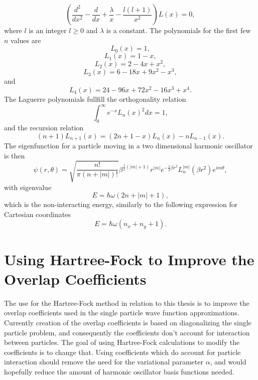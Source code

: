 \documentclass[../main.tex]{subfiles}
\begin{document}
\begin{equation}
    \left( \frac{d^2}{dx^2} - \frac{d}{dx} + \frac{\lambda}{x} - \frac{l(l+1)}{x^2} \right) L(x) = 0,
\end{equation}
where $l$ is an integer $l \geq 0$ and $\lambda$ is a constant. The polynomials for the first few $n$ values are
\begin{equation}
    L_0(x) = 1,
\end{equation}
\begin{equation}
    L_1(x) = 1-x,
\end{equation}
\begin{equation}
    L_2(x) = 2 - 4x + x^2,
\end{equation}
\begin{equation}
    L_3(x) = 6 - 18x + 9x^2 - x^3,
\end{equation}
and
\begin{equation}
    L_4(x) = 24 - 96x + 72x^2 -16x^3 + x^4.
\end{equation}
The Laguerre polynomials fullfill the orthogonality relation 
\begin{equation}
    \int_0^\infty e^{-x} L_n(x)^2 dx = 1,
\end{equation}
and the recursion relation 
\begin{equation}
    (n+1) L_{n+1}(x) = (2n + 1 - x) L_n(x) - n L_{n-1}(x).
\end{equation}
The eigenfunction for a particle moving in a two dimensional harmonic oscillator is then 
\begin{equation}
    \psi(r, \theta) = \sqrt{\frac{n!}{\pi (n + |m|)!}} \beta^{\frac{1}{2}(|m|+1)} r^{|m|} e^{-\frac{1}{2}\beta r^2} L_n^{|m|}(\beta r^2) e^{im\theta},
\end{equation}
with eigenvalue 
\begin{equation}
    E = \hbar \omega (2n + |m| + 1),
\end{equation}
which is the non-interacting energy, similarly to the following expression for Cartesian coordinates 
\begin{equation}
    E = \hbar \omega (n_x + n_y + 1).
\end{equation}

\section{Using Hartree-Fock to Improve the Overlap Coefficients}
The use for the Hartree-Fock method in relation to this thesis is to improve the overlap coefficients used in the single particle wave function approximations. Currently creation of the overlap coefficients is based on diagonalizing the single particle problem, and consequently the coefficients don't account for interaction between particles. The goal of using Hartree-Fock calculations to modify the coefficients is to change that. Using coefficients which do account for particle interaction should remove the need for the variational parameter $\alpha$, and would hopefully reduce the amount of harmonic oscillator basis functions needed.
\end{document}
